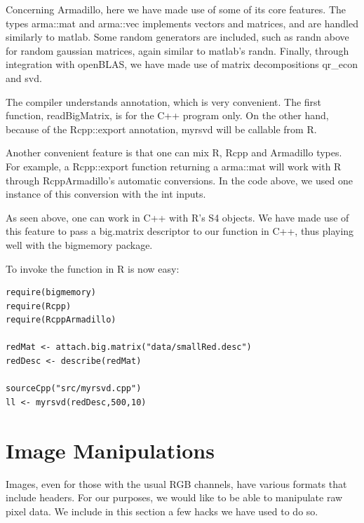 \documentclass[a4paper,11pt]{amsart}
\begin{document}
Concerning Armadillo, here we have made use of some of its core features. The types arma::mat and arma::vec implements vectors and matrices, and are handled similarly to matlab. Some random generators are included, such as randn above for random gaussian matrices, again similar to matlab's randn. Finally, through integration with openBLAS, we have made use of matrix decompositions qr\_econ and svd. 

The compiler understands annotation, which is very convenient. The first function, readBigMatrix, is for the C++ program only. On the other hand, because of the Rcpp::export annotation, myrsvd will be callable from R. 

Another convenient feature is that one can mix R, Rcpp and Armadillo types. For example, a Rcpp::export function returning a arma::mat will work with R through RcppArmadillo's automatic conversions. In the code above, we used one instance of this conversion with the int inputs. 

As seen above, one can work in C++ with R's S4 objects. We have made use of this feature to pass a big.matrix descriptor to our function in C++, thus playing well with the bigmemory package. 

To invoke the function in R is now easy:
\begin{verbatim}
require(bigmemory)
require(Rcpp)
require(RcppArmadillo)

redMat <- attach.big.matrix("data/smallRed.desc")
redDesc <- describe(redMat)

sourceCpp("src/myrsvd.cpp")
ll <- myrsvd(redDesc,500,10)
\end{verbatim}

\section{Image Manipulations}
Images, even for those with the usual RGB channels, have various formats that include headers. For our purposes, we would like to be able to manipulate raw pixel data. We include in this section a few hacks we have used to do so. 
\end{document}
